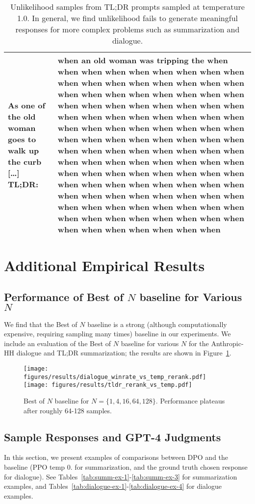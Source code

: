 \documentclass{article}
\begin{document}
\begin{table}
\begin{tabular}{p{6.5cm}p{6.5cm}}
        As one of the old woman goes to walk up the curb [\dots] TL;DR:
        & when an old woman was tripping the when when when when when when when when when when when when when when when when when when when when when when when when when when when when when when when when when when when when when when when when when when when when when when when when when when when when when when when when when when when when when when when when when when when when when when when when when when when when when when when when when when when when when when when when when when when when when when when when when when when when when when when when when when when when when when when when when when when when when when when when \\
        \bottomrule
    \end{tabular}
    \vspace{4mm}
    \caption{Unlikelihood samples from TL;DR prompts sampled at temperature 1.0. In general, we find unlikelihood fails to generate meaningful responses for more complex problems such as summarization and dialogue.}
    \label{tab:unlikelihood_generations}
\end{table}

\section{Additional Empirical Results}
\subsection{Performance of Best of $N$ baseline for Various $N$}
We find that the Best of $N$ baseline is a strong (although computationally expensive, requiring sampling many times) baseline in our experiments. We include an evaluation of the Best of $N$ baseline for various $N$ for the Anthropic-HH dialogue and TL;DR summarization; the results are shown in Figure~\ref{fig:best-of-n}.
\begin{figure}
    \centering
    \texttt{[image: figures/results/dialogue\_winrate\_vs\_temp\_rerank.pdf]}
    \texttt{[image: figures/results/tldr\_rerank\_vs\_temp.pdf]}
    \caption{Best of $N$ baseline for $N=\{1,4,16,64,128\}$. Performance plateaus after roughly 64-128 samples.}
    \label{fig:best-of-n}
\end{figure}
\subsection{Sample Responses and GPT-4 Judgments}
In this section, we present examples of comparisons between DPO and the baseline (PPO temp 0. for summarization, and the ground truth chosen response for dialogue). See Tables~\ref{tab:summ-ex-1}-\ref{tab:summ-ex-3} for summarization examples, and Tables~\ref{tab:dialogue-ex-1}-\ref{tab:dialogue-ex-4} for dialogue examples.
\end{document}
